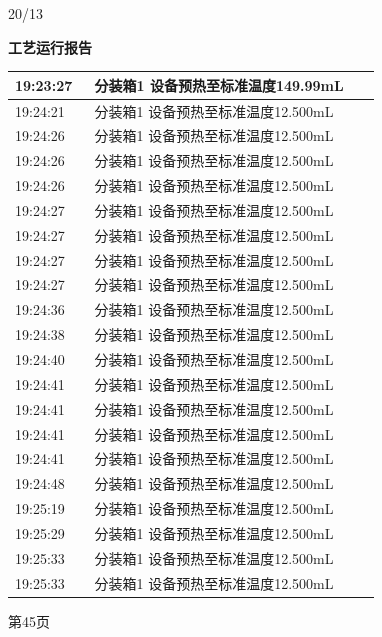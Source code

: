 \documentclass[UTF8,10pt,a4paper,fontset=fandol]{ctexart}
\newcommand{\handwritten}[1]{#1}
\begin{document}
\handwritten{20/13}

\newpage

\noindent
\begin{minipage}[t]{0.48\linewidth}
\centering
\textbf{工艺运行报告}

\vspace{2mm}
\scriptsize
\begin{tabular}{|p{0.20\linewidth}|p{0.72\linewidth}|}
\hline
19:23:27 & 分装箱1 设备预热至标准温度149.99mL \\ \hline
19:24:21 & 分装箱1 设备预热至标准温度12.500mL \\ \hline
19:24:26 & 分装箱1 设备预热至标准温度12.500mL \\ \hline
19:24:26 & 分装箱1 设备预热至标准温度12.500mL \\ \hline
19:24:26 & 分装箱1 设备预热至标准温度12.500mL \\ \hline
19:24:27 & 分装箱1 设备预热至标准温度12.500mL \\ \hline
19:24:27 & 分装箱1 设备预热至标准温度12.500mL \\ \hline
19:24:27 & 分装箱1 设备预热至标准温度12.500mL \\ \hline
19:24:27 & 分装箱1 设备预热至标准温度12.500mL \\ \hline
19:24:36 & 分装箱1 设备预热至标准温度12.500mL \\ \hline
19:24:38 & 分装箱1 设备预热至标准温度12.500mL \\ \hline
19:24:40 & 分装箱1 设备预热至标准温度12.500mL \\ \hline
19:24:41 & 分装箱1 设备预热至标准温度12.500mL \\ \hline
19:24:41 & 分装箱1 设备预热至标准温度12.500mL \\ \hline
19:24:41 & 分装箱1 设备预热至标准温度12.500mL \\ \hline
19:24:41 & 分装箱1 设备预热至标准温度12.500mL \\ \hline
19:24:48 & 分装箱1 设备预热至标准温度12.500mL \\ \hline
19:25:19 & 分装箱1 设备预热至标准温度12.500mL \\ \hline
19:25:29 & 分装箱1 设备预热至标准温度12.500mL \\ \hline
19:25:33 & 分装箱1 设备预热至标准温度12.500mL \\ \hline
19:25:33 & 分装箱1 设备预热至标准温度12.500mL \\ \hline
\end{tabular}

\vspace{2mm}
第45页
\end{minipage}
\end{document}
